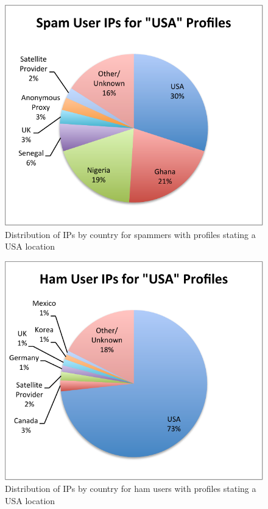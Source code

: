 \documentclass[preprint]{acm_proc_article-sp}
\begin{document}
\begin{figure}[h]
    \centering
    \includegraphics[width=\linewidth]{figures/ips-usa-spam.pdf}
    \caption{Distribution of IPs by country for spammers with profiles stating a USA location}
    \label{fig:usaspam}
\end{figure}

\begin{figure}[h]
    \centering
    \includegraphics[width=\linewidth]{figures/ips-usa-ham.pdf}
    \caption{Distribution of IPs by country for ham users with profiles stating a USA location}
    \label{fig:usaham}
\end{figure}
\end{document}
